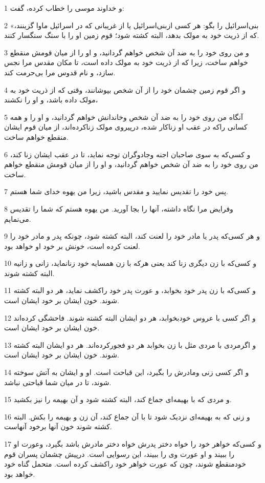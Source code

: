 \par 1 و خداوند موسی را خطاب کرده، گفت:
\par 2 «بنی‌اسرائیل را بگو: هر کسی ازبنی‌اسرائیل یا از غریبانی که در اسرائیل ماوا گزینند، که از ذریت خود به مولک بدهد، البته کشته شود؛ قوم زمین او را با سنگ سنگسار کنند.
\par 3 و من روی خود را به ضد آن شخص خواهم گردانید، و او را از میان قومش منقطع خواهم ساخت، زیرا که از ذریت خود به مولک داده است، تا مکان مقدس مرا نجس سازد، و نام قدوس مرا بی‌حرمت کند.
\par 4 و اگر قوم زمین چشمان خود را از آن شخص بپوشانند، وقتی که از ذریت خود به مولک داده باشد، و او را نکشند،
\par 5 آنگاه من روی خود را به ضد آن شخص وخاندانش خواهم گردانید، و او را و همه کسانی راکه در عقب او زناکار شده، در‌پیروی مولک زناکرده‌اند، از میان قوم ایشان منقطع خواهم ساخت.
\par 6 و کسی‌که به سوی صاحبان اجنه وجادوگران توجه نماید، تا در عقب ایشان زنا کند، من روی خود را به ضد آن شخص خواهم گردانید، و او را از میان قومش منقطع خواهم ساخت.
\par 7 پس خود را تقدیس نمایید و مقدس باشید، زیرا من یهوه خدای شما هستم.
\par 8 وفرایض مرا نگاه داشته، آنها را بجا آورید. من یهوه هستم که شما را تقدیس می‌نمایم.
\par 9 و هر کسی‌که پدر یا مادر خود را لعنت کند، البته کشته شود، چونکه پدر و مادر خود را لعنت کرده است، خونش بر خود او خواهد بود.
\par 10 و کسی‌که با زن دیگری زنا کند یعنی هر‌که با زن همسایه خود زنانماید، زانی و زانیه البته کشته شوند.
\par 11 و کسی‌که با زن پدر خود بخوابد، و عورت پدر خود راکشف نماید، هر دو البته کشته شوند. خون ایشان بر خود ایشان است.
\par 12 و اگر کسی با عروس خودبخوابد، هر دو ایشان البته کشته شوند. فاحشگی کرده‌اند خون ایشان بر خود ایشان است.
\par 13 و اگرمردی با مردی مثل با زن بخوابد هر دو فجورکرده‌اند. هر دو ایشان البته کشته شوند. خون ایشان بر خود ایشان است.
\par 14 و اگر کسی زنی ومادرش را بگیرد، این قباحت است. او و ایشان به آتش سوخته شوند، تا در میان شما قباحتی نباشد.
\par 15 و مردی که با بهیمه‌ای جماع کند، البته کشته شود و آن بهیمه را نیز بکشید.
\par 16 و زنی که به بهیمه‌ای نزدیک شود تا با آن جماع کند، آن زن و بهیمه را بکش. البته کشته شوند خون آنها برخود آنهاست.
\par 17 و کسی‌که خواهر خود را خواه دختر پدرش خواه دختر مادرش باشد بگیرد، وعورت او را ببیند و او عورت وی را ببیند، این رسوایی است. در‌پیش چشمان پسران قوم خودمنقطع شوند، چون که عورت خواهر خود راکشف کرده است. متحمل گناه خود خواهد بود.
